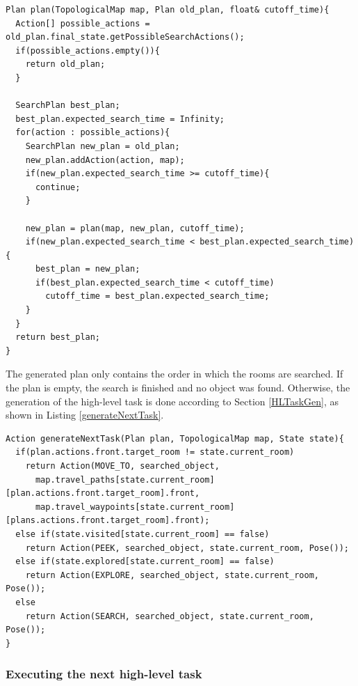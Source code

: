 \begin{minipage}{\linewidth}
\begin{lstlisting}[caption=plan function,frame=single, label=planFunction]
Plan plan(TopologicalMap map, Plan old_plan, float& cutoff_time){
  Action[] possible_actions = old_plan.final_state.getPossibleSearchActions();
  if(possible_actions.empty()){
    return old_plan;
  }
  
  SearchPlan best_plan;
  best_plan.expected_search_time = Infinity;
  for(action : possible_actions){
    SearchPlan new_plan = old_plan;
    new_plan.addAction(action, map);
    if(new_plan.expected_search_time >= cutoff_time){
      continue;
    }

    new_plan = plan(map, new_plan, cutoff_time);
    if(new_plan.expected_search_time < best_plan.expected_search_time){
      best_plan = new_plan;
      if(best_plan.expected_search_time < cutoff_time)
        cutoff_time = best_plan.expected_search_time;
    }
  }
  return best_plan;
}
\end{lstlisting}
\end{minipage}

The generated plan only contains the order in which the rooms are searched. If the plan is empty, the search is finished and no object was found. Otherwise, the generation of the high-level task is done according to Section \ref{HLTaskGen}, as shown in Listing \ref{generateNextTask}. 

\begin{minipage}{\linewidth}
\begin{lstlisting}[caption=generateNextTask function,frame=single, label=generateNextTask]
Action generateNextTask(Plan plan, TopologicalMap map, State state){
  if(plan.actions.front.target_room != state.current_room)
    return Action(MOVE_TO, searched_object, 
      map.travel_paths[state.current_room][plan.actions.front.target_room].front,
      map.travel_waypoints[state.current_room][plans.actions.front.target_room].front);
  else if(state.visited[state.current_room] == false)
    return Action(PEEK, searched_object, state.current_room, Pose());
  else if(state.explored[state.current_room] == false)
    return Action(EXPLORE, searched_object, state.current_room, Pose());
  else
    return Action(SEARCH, searched_object, state.current_room, Pose());
}
\end{lstlisting}
\end{minipage}

\subsubsection{Executing the next high-level task}

